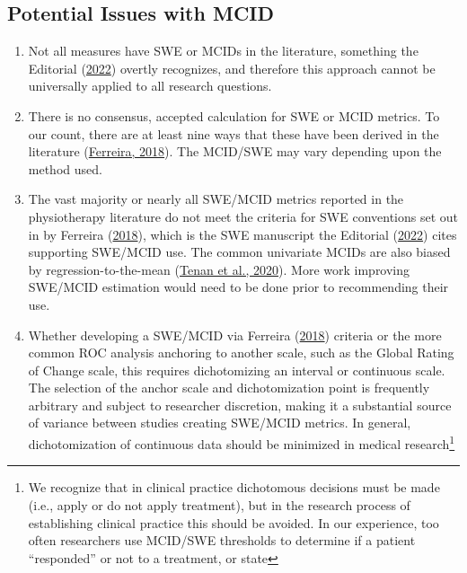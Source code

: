 \documentclass[]{cik}%
\begin{document}
\hypertarget{potential-issues-with-mcid}{%
\subsection{Potential Issues with
MCID}\label{potential-issues-with-mcid}}

\begin{enumerate}
\def\labelenumi{\arabic{enumi}.}
\tightlist
\item
  Not all measures have SWE or MCIDs in the literature, something the
  Editorial (\protect\hyperlink{ref-elkins2022}{2022}) overtly
  recognizes, and therefore this approach cannot be universally applied
  to all research questions.
\item
  There is no consensus, accepted calculation for SWE or MCID metrics.
  To our count, there are at least nine ways that these have been
  derived in the literature
  (\protect\hyperlink{ref-ferreira2018}{Ferreira, 2018}). The MCID/SWE
  may vary depending upon the method used.
\item
  The vast majority or nearly all SWE/MCID metrics reported in the
  physiotherapy literature do not meet the criteria for SWE conventions
  set out in by Ferreira (\protect\hyperlink{ref-ferreira2018}{2018}),
  which is the SWE manuscript the Editorial
  (\protect\hyperlink{ref-elkins2022}{2022}) cites supporting SWE/MCID
  use. The common univariate MCIDs are also biased by
  regression-to-the-mean (\protect\hyperlink{ref-tenan2020}{Tenan et
  al., 2020}). More work improving SWE/MCID estimation would need to be
  done prior to recommending their use.
\item
  Whether developing a SWE/MCID via Ferreira
  (\protect\hyperlink{ref-ferreira2018}{2018}) criteria or the more
  common ROC analysis anchoring to another scale, such as the Global
  Rating of Change scale, this requires dichotomizing an interval or
  continuous scale. The selection of the anchor scale and
  dichotomization point is frequently arbitrary and subject to
  researcher discretion, making it a substantial source of variance
  between studies creating SWE/MCID metrics. In general, dichotomization
  of continuous data should be minimized in medical research\footnote{We
    recognize that in clinical practice dichotomous decisions must be
    made (i.e., apply or do not apply treatment), but in the research
    process of establishing clinical practice this should be avoided. In
    our experience, too often researchers use MCID/SWE thresholds to
    determine if a patient ``responded'' or not to a treatment, or state
}
\end{enumerate}
\end{document}

